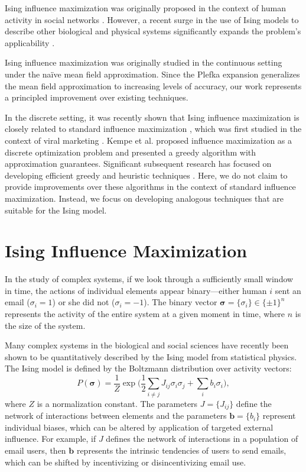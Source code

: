 \documentclass[letterpaper]{article} %
\begin{document}
Ising influence maximization was originally proposed in the context of human activity in social networks \cite{Lynn-01}. However, a recent surge in the use of Ising models to describe other biological and physical systems significantly expands the problem's applicability \cite{Stein-01}.

Ising influence maximization was originally studied in the continuous setting under the na\"{i}ve mean field approximation. Since the Plefka expansion generalizes the mean field approximation to increasing levels of accuracy, our work represents a principled improvement over existing techniques.

In the discrete setting, it was recently shown that Ising influence maximization is closely related to standard influence maximization \cite{Lynn-02}, which was first studied in the context of viral marketing \cite{Domingos-01}. Kempe et al. \cite{Kempe-01} proposed influence maximization as a discrete optimization problem and presented a greedy algorithm with approximation guarantees. Significant subsequent research has focused on developing efficient greedy and heuristic techniques \cite{Leskovec-01,Chen-02,Chen-03}. Here, we do not claim to provide improvements over these algorithms in the context of standard influence maximization. Instead, we focus on developing analogous techniques that are suitable for the Ising model.

\section{Ising Influence Maximization}

In the study of complex systems, if we look through a sufficiently small window in time, the actions of individual elements appear binary---either human $i$ sent an email ($\sigma_i = 1$) or she did not ($\sigma_i = -1$). The binary vector $\bm{\sigma} = \{\sigma_i\}\in \{\pm 1\}^n$ represents the activity of the entire system at a given moment in time, where $n$ is the size of the system.

Many complex systems in the biological and social sciences have recently been shown to be quantitatively described by the Ising model from statistical physics. The Ising model is defined by the Boltzmann distribution over activity vectors:
\begin{equation}
\label{Boltzmann}
P(\bm{\sigma}) = \frac{1}{Z}\exp\Bigg(\frac{1}{2}\sum_{i\neq j}J_{ij}\sigma_i\sigma_j + \sum_i b_i\sigma_i\Bigg),
\end{equation}
where $Z$ is a normalization constant. The parameters $J = \{J_{ij}\}$ define the network of interactions between elements and the parameters $\bm{b} = \{b_i\}$ represent individual biases, which can be altered by application of targeted external influence. For example, if $J$ defines the network of interactions in a population of email users, then $\bm{b}$ represents the intrinsic tendencies of users to send emails, which can be shifted by incentivizing or disincentivizing email use.
\end{document}
